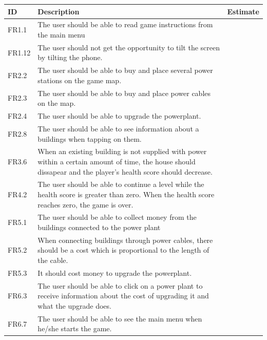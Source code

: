 	\begin{tabular}{| p{1cm} | p{8cm} | p{3cm} |}
		\hline
		\rowcolor{gray}
		ID & Description & Estimate \\ \hline
		FR1.1 & The user should be able to read game instructions from the main menu
		& \\ \hline

		FR1.12 & The user should not get the opportunity to tilt the screen by tilting the phone. & \\ \hline
		
		FR2.2 & The user should be able to buy and place several power stations on the game map.
		& \\ \hline

		FR2.3 & The user should be able to buy and place power cables on the map. &  \\ \hline

		FR2.4 & The user should be able to upgrade the powerplant. & \\ \hline

		FR2.8 & The user should be able to see information about a buildings when tapping on them.
		& \\ \hline

		FR3.6 & When an existing building is not supplied with power within a certain amount of time, 
		the house should dissapear and the player's health score should decrease. & \\ \hline

		FR4.2 & The user should be able to continue a level while the health score is greater than zero. 
		When the health score reaches zero, the game is over. & \\ \hline

		FR5.1 & The user should be able to collect money from the buildings connected to the power plant
		& \\ \hline

		FR5.2 & When connecting buildings through power cables, there should be a cost which is 
		proportional to the length of the cable. & \\ \hline

		FR5.3 & It should cost money to upgrade the powerplant. & \\ \hline

		FR6.3 & The user should be able to click on a power plant to receive information about 
		the cost of upgrading it and what the upgrade does. & \\ \hline

		FR6.7 & The user should be able to see the main menu when he/she starts the game. & \\ \hline


\end{tabular}
